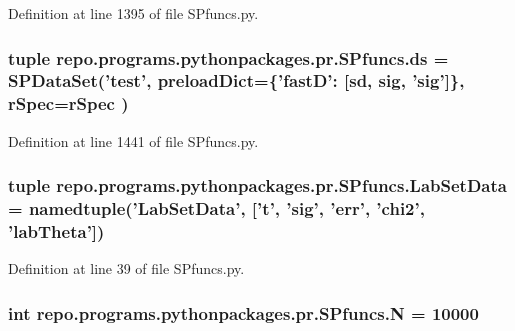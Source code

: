 Definition at line 1395 of file S\-Pfuncs.\-py.

\hypertarget{namespacerepo_1_1programs_1_1pythonpackages_1_1pr_1_1SPfuncs_a5e62fc21df71cfdd96a1c0048b264295}{
\subsubsection[{ds}]{\setlength{\rightskip}{0pt plus 5cm}tuple repo.\-programs.\-pythonpackages.\-pr.\-S\-Pfuncs.\-ds = S\-P\-Data\-Set('test', preload\-Dict=\{'fast\-D'\-: \mbox{[}sd, sig, 'sig'\mbox{]}\}, {\bf r\-Spec}={\bf r\-Spec} )}}\label{namespacerepo_1_1programs_1_1pythonpackages_1_1pr_1_1SPfuncs_a5e62fc21df71cfdd96a1c0048b264295}


Definition at line 1441 of file S\-Pfuncs.\-py.

\hypertarget{namespacerepo_1_1programs_1_1pythonpackages_1_1pr_1_1SPfuncs_a98ebdcd3ceb3fa1b7bc74e8caf64b50d}{
\subsubsection[{Lab\-Set\-Data}]{\setlength{\rightskip}{0pt plus 5cm}tuple repo.\-programs.\-pythonpackages.\-pr.\-S\-Pfuncs.\-Lab\-Set\-Data = namedtuple('Lab\-Set\-Data', \mbox{[}'{\bf t}', 'sig', 'err', 'chi2', 'lab\-Theta'\mbox{]})}}\label{namespacerepo_1_1programs_1_1pythonpackages_1_1pr_1_1SPfuncs_a98ebdcd3ceb3fa1b7bc74e8caf64b50d}


Definition at line 39 of file S\-Pfuncs.\-py.

\hypertarget{namespacerepo_1_1programs_1_1pythonpackages_1_1pr_1_1SPfuncs_aaea13a6ab57b30bea3669d56fd489e30}{
\subsubsection[{N}]{\setlength{\rightskip}{0pt plus 5cm}int repo.\-programs.\-pythonpackages.\-pr.\-S\-Pfuncs.\-N = 10000}}\label{namespacerepo_1_1programs_1_1pythonpackages_1_1pr_1_1SPfuncs_aaea13a6ab57b30bea3669d56fd489e30}


